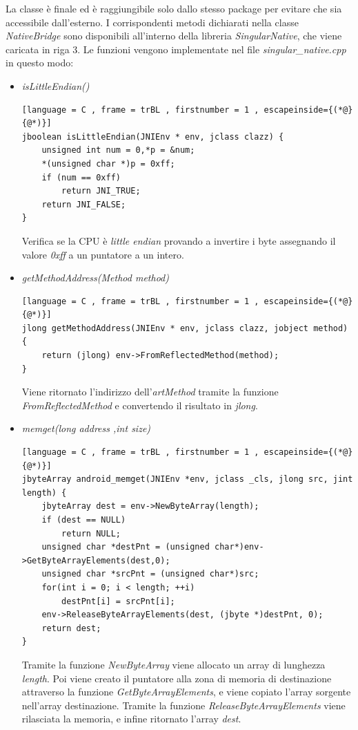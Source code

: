 La classe è finale ed è raggiungibile solo dallo stesso package per evitare che sia accessibile dall'esterno.
I corrispondenti metodi dichiarati nella classe \emph{NativeBridge} sono disponibili all'interno della libreria \emph{SingularNative}, che viene caricata in riga 3. Le funzioni vengono implementate nel file \emph{singular\_native.cpp} in questo modo:
\begin{itemize}
    \item \emph{isLittleEndian()}
    \begin{lstlisting}[language = C , frame = trBL , firstnumber = 1 , escapeinside={(*@}{@*)}]
jboolean isLittleEndian(JNIEnv * env, jclass clazz) {
    unsigned int num = 0,*p = &num;
    *(unsigned char *)p = 0xff;
    if (num == 0xff)
        return JNI_TRUE;
    return JNI_FALSE;
}
\end{lstlisting}

Verifica se la CPU è \emph{little endian} provando a invertire i byte assegnando il valore \emph{0xff} a un puntatore a un intero.

    \item \emph{getMethodAddress(Method method)}
\begin{lstlisting}[language = C , frame = trBL , firstnumber = 1 , escapeinside={(*@}{@*)}]
jlong getMethodAddress(JNIEnv * env, jclass clazz, jobject method) {
    return (jlong) env->FromReflectedMethod(method);
}
\end{lstlisting}
Viene ritornato l'indirizzo dell'\emph{artMethod} tramite la funzione \emph{FromReflectedMethod} e convertendo il risultato in \emph{jlong}.

    \item \emph{memget(long address ,int size)}
\begin{lstlisting}[language = C , frame = trBL , firstnumber = 1 , escapeinside={(*@}{@*)}]
jbyteArray android_memget(JNIEnv *env, jclass _cls, jlong src, jint length) {
    jbyteArray dest = env->NewByteArray(length);
    if (dest == NULL)
        return NULL;
    unsigned char *destPnt = (unsigned char*)env->GetByteArrayElements(dest,0);
    unsigned char *srcPnt = (unsigned char*)src;
    for(int i = 0; i < length; ++i)
        destPnt[i] = srcPnt[i];
    env->ReleaseByteArrayElements(dest, (jbyte *)destPnt, 0);
    return dest;
}
\end{lstlisting}
Tramite la funzione \emph{NewByteArray} viene allocato un array di lunghezza \emph{length}. Poi viene creato il puntatore alla zona di memoria di destinazione attraverso la funzione \emph{GetByteArrayElements}, e viene copiato l'array sorgente nell'array destinazione.
Tramite la funzione \emph{ReleaseByteArrayElements} viene rilasciata la memoria, e infine ritornato l'array \emph{dest}.
\end{itemize}


